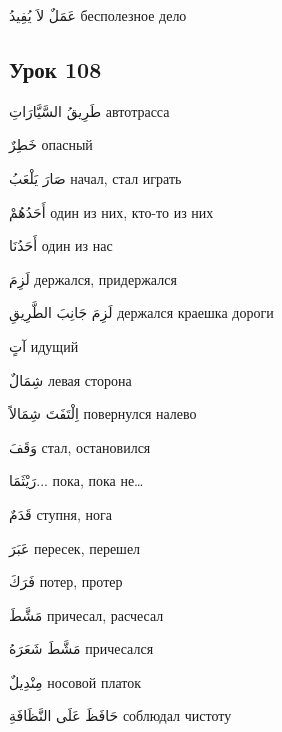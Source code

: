 \documentclass[a5paper]{article}
\newcommand\textstyleDropCaps[1]{#1}
\newcommand\textstyleCaptioncharacters[1]{#1}
\begin{document}
\textstyleCaptioncharacters{عَمَلٌ لاَ يُفِيدُ }\textstyleDropCaps{бесполез­ное дело‎}

\subsection[Урок 108‎]{\textstyleDropCaps{Урок 108‎}}
\textstyleCaptioncharacters{طَرِيقُ السَّيَّارَاتِ }\textstyleDropCaps{авто­трасса‎}

\textstyleCaptioncharacters{خَطِرٌ }\textstyleDropCaps{опасный‎}

\textstyleCaptioncharacters{صَارَ يَلْعَبُ }\textstyleDropCaps{начал, стал иг­рать‎}

\textstyleCaptioncharacters{أَحَدُهُمْ }\textstyleDropCaps{один из них, кто-то из них‎}

\textstyleCaptioncharacters{أَحَدُنَا }\textstyleDropCaps{один из нас‎}

\textstyleCaptioncharacters{لَزِمَ }\textstyleDropCaps{держался, придержал­ся‎}

\textstyleCaptioncharacters{لَزِمَ جَانِبَ الطَّرِيقِ }\textstyleDropCaps{дер­жался краешка дороги ‎}

\textstyleCaptioncharacters{آتٍ }\textstyleDropCaps{идущий‎}

\textstyleCaptioncharacters{شِمَالٌ }\textstyleDropCaps{левая сторона‎}

\textstyleCaptioncharacters{اِلْتَفَتَ شِمَالاً }\textstyleDropCaps{повернулс­я налево‎}

\textstyleCaptioncharacters{وَقَفَ }\textstyleDropCaps{стал, остановился‎}

\textstyleCaptioncharacters{رَيْثَمَا... }\textstyleDropCaps{пока, пока не…‎}

\textstyleCaptioncharacters{قَدَمٌ }\textstyleDropCaps{ступня, нога‎}

\textstyleCaptioncharacters{عَبَرَ }\textstyleDropCaps{пересек, перешел‎}

\textstyleCaptioncharacters{فَرَكَ }\textstyleDropCaps{потер, протер‎}

\textstyleCaptioncharacters{مَشَّطَ }\textstyleDropCaps{причесал, расчесал‎}

\textstyleCaptioncharacters{مَشَّطَ شَعَرَهُ }\textstyleDropCaps{причесался‎}

\textstyleCaptioncharacters{مِنْدِيلٌ }\textstyleDropCaps{носовой платок‎}

\textstyleCaptioncharacters{حَافَظَ عَلَى النَّظَافَةِ }\textstyleDropCaps{соблюдал чистоту‎}
\end{document}
